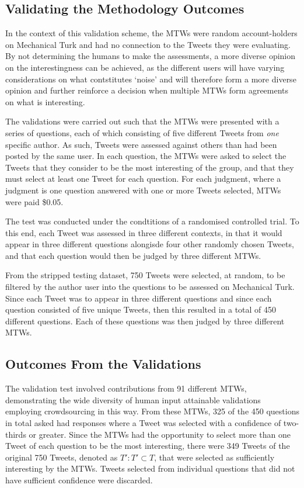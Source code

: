 \subsection{Validating the Methodology Outcomes}
In the context of this validation scheme, the MTWs were random account-holders on Mechanical Turk and had no connection to the Tweets they were evaluating. By not determining the humans to make the assessments, a more diverse opinion on the interestingness can be achieved, as the different users will have varying considerations on what contstitutes `noise' and will therefore form a more diverse opinion and further reinforce a decision when multiple MTWs form agreements on what is interesting. 

The validations were carried out such that the MTWs were presented with a series of questions, each of which consisting of five different Tweets from \textit{one} specific author. As such, Tweets were assessed against others than had been posted by the same user. In each question, the MTWs were asked to select the Tweets that they consider to be the most interesting of the group, and that they must select at least one Tweet for each question. For each judgment, where a judgment is one question answered with one or more Tweets selected, MTWs were paid \$0.05.

The test was conducted under the condtitions of a randomised controlled trial. To this end, each Tweet was assessed in three different contexts, in that it would appear in three different questions alongisde four other randomly chosen Tweets, and that each question would then be judged by three different MTWs.

From the stripped testing dataset, 750 Tweets were selected, at random, to be filtered by the author user into the questions to be assessed on Mechanical Turk. Since each Tweet was to appear in three different questions and since each question consisted of five unique Tweets, then this resulted in a total of 450 different questions. Each of these questions was then judged by three different MTWs.


\subsection{Outcomes From the Validations}
The validation test involved contributions from 91 different MTWs, demonstrating the wide diversity of human input attainable validations employing crowdsourcing in this way. From these MTWs, 325 of the 450 questions in total asked had responses where a Tweet was selected with a confidence of two-thirds or greater. Since the MTWs had the opportunity to select more than one Tweet of each question to be the most interesting, there were 349 Tweets of the original 750 Tweets, denoted as $T' : T' \subset T$, that were selected as sufficiently interesting by the MTWs. Tweets selected from individual questions that did not have sufficient confidence were discarded.

